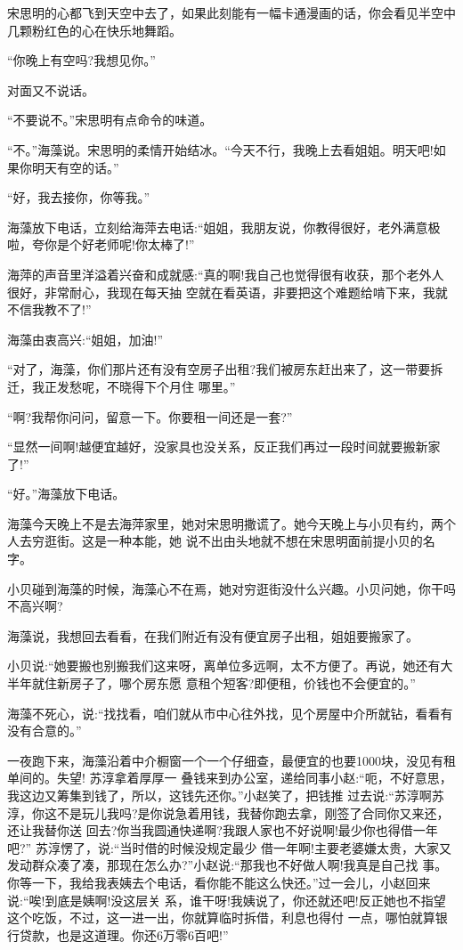 \documentclass[11pt,a4paper,onecolumn]{article}
\begin{document}
宋思明的心都飞到天空中去了，如果此刻能有一幅卡通漫画的话，你会看见半空中几颗粉红色的心在快乐地舞蹈。

``你晚上有空吗?我想见你。''

对面又不说话。

``不要说不。''宋思明有点命令的味道。

``不。''海藻说。宋思明的柔情开始结冰。``今天不行，我晚上去看姐姐。明天吧!如果你明天有空的话。''

``好，我去接你，你等我。''

海藻放下电话，立刻给海萍去电话:``姐姐，我朋友说，你教得很好，老外满意极啦，夸你是个好老师呢!你太棒了!''

海萍的声音里洋溢着兴奋和成就感:``真的啊!我自己也觉得很有收获，那个老外人很好，非常耐心，我现在每天抽
空就在看英语，非要把这个难题给啃下来，我就不信我教不了!''

海藻由衷高兴:``姐姐，加油!''

``对了，海藻，你们那片还有没有空房子出租?我们被房东赶出来了，这一带要拆迁，我正发愁呢，不晓得下个月住
哪里。''

``啊?我帮你问问，留意一下。你要租一间还是一套?''

``显然一间啊!越便宜越好，没家具也没关系，反正我们再过一段时间就要搬新家了!''

``好。''海藻放下电话。

海藻今天晚上不是去海萍家里，她对宋思明撒谎了。她今天晚上与小贝有约，两个人去穷逛街。这是一种本能，她
说不出由头地就不想在宋思明面前提小贝的名字。

小贝碰到海藻的时候，海藻心不在焉，她对穷逛街没什么兴趣。小贝问她，你干吗不高兴啊?

海藻说，我想回去看看，在我们附近有没有便宜房子出租，姐姐要搬家了。

小贝说:``她要搬也别搬我们这来呀，离单位多远啊，太不方便了。再说，她还有大半年就住新房子了，哪个房东愿
意租个短客?即便租，价钱也不会便宜的。''

海藻不死心，说:``找找看，咱们就从市中心往外找，见个房屋中介所就钻，看看有没有合意的。''

一夜跑下来，海藻沿着中介橱窗一个一个仔细查，最便宜的也要1000块，没见有租单间的。失望! 苏淳拿着厚厚一
叠钱来到办公室，递给同事小赵:``呃，不好意思，我这边又筹集到钱了，所以，这钱先还你。''小赵笑了，把钱推
过去说:``苏淳啊苏淳，你这不是玩儿我吗?是你说急着用钱，我替你跑去拿，刚签了合同你又来还，还让我替你送
回去?你当我圆通快递啊?我跟人家也不好说啊!最少你也得借一年吧?'' 苏淳愣了，说:``当时借的时候没规定最少
借一年啊!主要老婆嫌太贵，大家又发动群众凑了凑，那现在怎么办?''小赵说:``那我也不好做人啊!我真是自己找
事。你等一下，我给我表姨去个电话，看你能不能这么快还。''过一会儿，小赵回来说:``唉!到底是姨啊!没这层关
系，谁干呀!我姨说了，你还就还吧!反正她也不指望这个吃饭，不过，这一进一出，你就算临时拆借，利息也得付
一点，哪怕就算银行贷款，也是这道理。你还6万零6百吧!''
\end{document}
